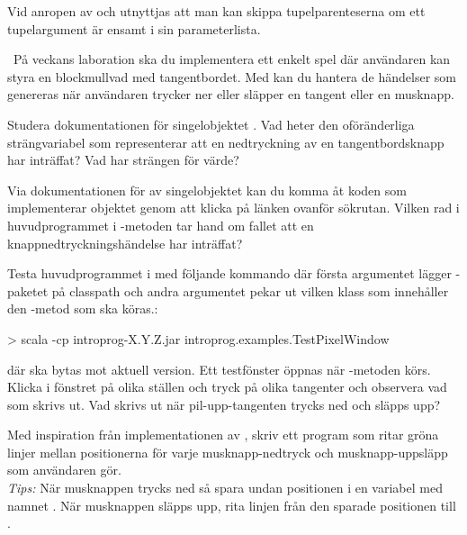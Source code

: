 \SubtaskSolved Vid anropen av  och  utnyttjas att man kan skippa tupelparenteserna om ett tupelargument är ensamt i sin parameterlista.



\QUESTEND




\QUESTBEGIN

\Task \what~På veckans laboration ska du implementera ett enkelt spel där användaren kan styra en blockmullvad med tangentbordet. Med  kan du hantera de händelser som genereras när användaren trycker ner eller släpper en tangent eller en musknapp.


\Subtask Studera dokumentationen för singelobjektet . Vad heter den oföränderliga strängvariabel som representerar att en nedtryckning av en tangentbordsknapp har inträffat? Vad har strängen för värde?

\Subtask Via dokumentationen för av singelobjektet  kan du komma åt koden som implementerar objektet genom att klicka på länken  ovanför sökrutan. Vilken rad i huvudprogrammet i -metoden tar hand om fallet att en knappnedtryckningshändelse har inträffat?

\Subtask Testa huvudprogrammet i  med följande kommando där första argumentet lägger -paketet på classpath och andra argumentet pekar ut vilken klass som innehåller den -metod som ska köras.:
\begin{REPLnonum}
> scala -cp introprog-X.Y.Z.jar introprog.examples.TestPixelWindow
\end{REPLnonum}
där  ska bytas mot aktuell version. Ett testfönster öppnas när -metoden körs. Klicka i fönstret på olika ställen och tryck på olika tangenter och observera vad som skrivs ut. Vad skrivs ut när pil-upp-tangenten trycks ned och släpps upp?

\Subtask Med inspiration från implementationen av , skriv ett program som ritar gröna linjer mellan positionerna för varje musknapp-nedtryck och musknapp-uppsläpp som användaren gör. \\\emph{Tips:} När musknappen trycks ned så spara undan positionen i en variabel med namnet . När musknappen släpps upp, rita linjen från den sparade positionen till .

